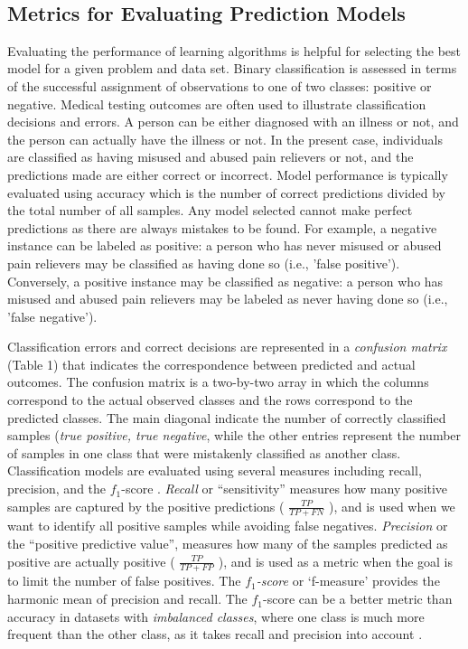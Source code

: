 \\\documentclass[sigconf]{acmart}
\begin{document}

\subsection{Metrics for Evaluating Prediction Models}

Evaluating the performance of learning algorithms is helpful for selecting 
the best model for a given problem and data set. Binary classification is 
assessed in terms of the successful assignment of observations to one of two 
classes: positive or negative. Medical testing outcomes are often used to 
illustrate classification decisions and errors. A person can be either 
diagnosed with an illness or not, and the person can actually have the 
illness or not. In the present case, individuals are classified as having 
misused and abused pain relievers or not, and the predictions made are either 
correct or incorrect. Model performance is typically evaluated using accuracy 
which is the number of correct predictions divided by the total number of 
all samples. Any model selected cannot make perfect predictions as there are 
always mistakes to be found. For example, a negative instance can be labeled 
as positive: a person who has never misused or abused pain relievers may be 
classified as having done so (i.e., 'false positive'). Conversely, a positive 
instance may be classified as negative: a person who has misused and abused 
pain relievers may be labeled as never having done so (i.e., 'false negative').


Classification errors and correct decisions are represented in a 
\emph{confusion matrix} (Table 1) that indicates the correspondence between 
predicted and actual outcomes. The confusion matrix is a two-by-two array in 
which the columns correspond to the actual observed classes and the rows 
correspond to the predicted classes. The main diagonal indicate the number of 
correctly classified samples (\emph{true positive, true negative}, while the 
other entries represent the number of samples in one class that were mistakenly 
classified as another class. Classification models are evaluated using several 
measures including recall, precision, and the $f_1$-score \cite{wiki18}. 
\emph{Recall} or ``sensitivity'' measures how many positive samples are 
captured by the positive predictions ( \(\frac{TP}{TP+FN}\) ), and is used 
when we want to identify all positive samples while avoiding false negatives. 
\emph{Precision} or the ``positive predictive value'', measures how many of 
the samples predicted as positive are actually positive 
( \(\frac{TP}{TP+FP}\) ), and is used as a metric when the goal is to limit 
the number of false positives. The \emph{$f_1$-score} or `f-measure' provides 
the harmonic mean of precision and recall. The $f_1$-score can be a better 
metric than accuracy in datasets with \emph{imbalanced classes}, where one 
class is much more frequent than the other class, as it takes recall and 
precision into account \cite{muller17}.
\end{document}
